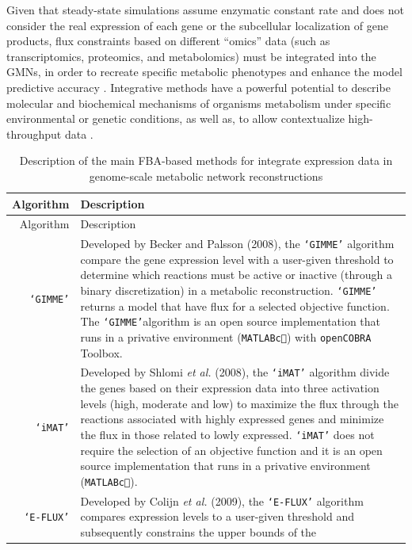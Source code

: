 Given that steady-state simulations assume enzymatic constant rate and does not consider the real expression of each gene or the subcellular localization of gene products, flux constraints based on different “omics” data (such as transcriptomics, proteomics, and metabolomics) must be integrated into the GMNs, in order to recreate specific metabolic phenotypes and enhance the model predictive accuracy \cite{palsson2002silico, chen2012metabolic, lewis2012constraining,topfer2013integration}. Integrative methods have a powerful potential to describe molecular and biochemical mechanisms of organisms metabolism under specific environmental or genetic conditions, as well as, to allow contextualize high-throughput data \cite{Oberhardt2009}.

\begin{center}
\begin{longtable}{|r|m{13cm}|}
\caption{Description of the main FBA-based methods for integrate expression data in genome-scale metabolic network reconstructions} \label{ComparisonEF}\\
\hline
Algorithm&Description\\
\hline
\hline
\endfirsthead
\hline
Algorithm&Description\\
\hline
\hline
\endhead
\texttt{`GIMME'} \cite{Becker2008} & Developed by Becker and Palsson (2008), the \texttt{`GIMME'} algorithm compare the gene expression level with a user-given threshold to determine which reactions must be active or inactive (through a binary discretization) in a metabolic reconstruction. \texttt{`GIMME'} returns a model that have flux for a selected objective function. The \texttt{`GIMME'}algorithm is an open source implementation that runs in a privative environment (\texttt{MATLAB\textcircled{c}}) with \texttt{openCOBRA} Toolbox.\\
\hline
\texttt{`iMAT'} \cite{Shlomi2008} & Developed by Shlomi \textit{et al.} (2008), the \texttt{`iMAT'} algorithm divide the genes based on their expression data into three activation levels (high, moderate and low) to maximize the flux through the reactions associated with highly expressed genes and minimize the flux in those related to lowly expressed. \texttt{`iMAT'} does not require the selection of an objective function and it is an open source implementation that runs in a privative environment (\texttt{MATLAB\textcircled{c}}).\\
\hline
\texttt{`E-FLUX'} \cite{colijn2009interpreting} & Developed by Colijn \textit{et al.} (2009), the \texttt{`E-FLUX'} algorithm compares expression levels to a user-given threshold and subsequently constrains the upper bounds of the

\end{longtable}
\end{center}
